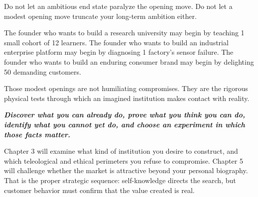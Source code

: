 Do not let an ambitious end state paralyze the opening move. Do not let a modest opening move truncate your long-term ambition either.

The founder who wants to build a research university may begin by teaching 1 small cohort of 12 learners. The founder who wants to build an industrial enterprise platform may begin by diagnosing 1 factory's sensor failure. The founder who wants to build an enduring consumer brand may begin by delighting 50 demanding customers.

Those modest openings are not humiliating compromises. They are the rigorous physical tests through which an imagined institution makes contact with reality.

\begin{tcolorbox}[
  enhanced,
  colback=BayesPale!30!white,
  colframe=BayesBorder!70!white,
  boxrule=0.4pt,
  arc=2pt,
  borderline west={2.2pt}{0pt}{BayesTeal},
  left=8pt,right=8pt,top=4pt,bottom=4pt,
  before skip=3pt,after skip=4pt
]
\footnotesize\color{BayesInk}\itshape
\textbf{Discover what you can already do, prove what you think you can do, identify what you cannot yet do, and choose an experiment in which those facts matter.}
\end{tcolorbox}

Chapter 3 will examine what kind of institution you desire to construct, and which teleological and ethical perimeters you refuse to compromise. Chapter 5 will challenge whether the market is attractive beyond your personal biography. That is the proper strategic sequence: self-knowledge directs the search, but customer behavior must confirm that the value created is real.
